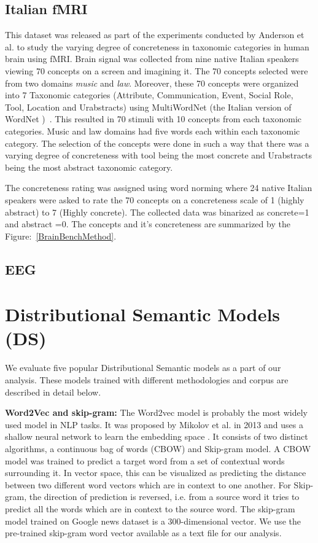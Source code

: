 \subsection{Italian fMRI}
This dataset was released as part of the experiments conducted by Anderson et al. to study the varying degree of concreteness in taxonomic categories in human brain using fMRI. Brain signal was collected from nine native Italian speakers viewing 70 concepts on a screen and imagining it. The 70 concepts selected were from two domains \textit{music} and \textit{law}. Moreover, these 70 concepts were organized into 7 Taxonomic categories (Attribute, Communication, Event, Social Role, Tool, Location and Urabstracts) using MultiWordNet (the Italian version of WordNet \cite{wordnet})~\cite{ItalianWordNet}. This resulted in 70 stimuli with 10 concepts from each taxonomic categories. Music and law domains had five words each within each taxonomic category. The selection of the concepts were done in such a way that there was a varying degree of concreteness with tool being the most concrete  and Urabstracts being the most abstract taxonomic category. 

The concreteness rating was assigned using word norming \cite{Barca2002WordNT} where 24 native Italian speakers were asked to rate the 70 concepts on a concreteness scale of 1 (highly abstract) to 7 (Highly concrete). The collected data was binarized as concrete=1 and abstract =0. The concepts and it's concreteness are summarized by the Figure:~\ref{BrainBenchMethod}.
\subsection{EEG}

\section{Distributional Semantic Models (DS)}
We evaluate five popular Distributional Semantic models as a part of our analysis. These models trained with different methodologies and corpus are described in detail below.

\noindent \textbf{Word2Vec and skip-gram:} The Word2vec model is probably the most widely
used model in NLP tasks. It was proposed by Mikolov et al. in
2013 and uses a shallow neural network to learn the embedding
space \cite{Word2Vec}. It consists of two distinct algorithms, a continuous bag
of words (CBOW) and Skip-gram model. A CBOW model was
trained to predict a target word from a set of contextual words
surrounding it. In vector space, this can be visualized as
predicting the distance between two different word vectors
which are in context to one another. For Skip-gram, the
direction of prediction is reversed, i.e. from a source word it
tries to predict all the words which are in context to the source
word. The skip-gram model trained on Google
news dataset is a 300-dimensional vector. We use the pre-trained skip-gram word vector available as a text file for our analysis.


